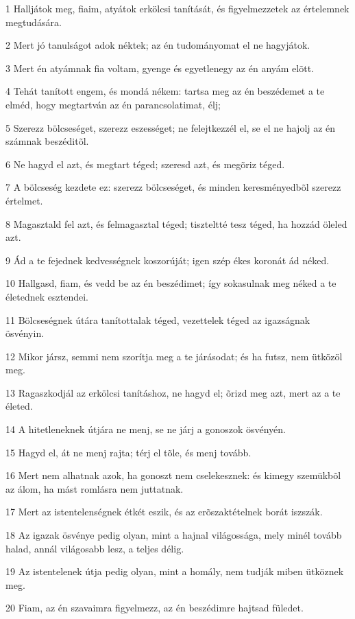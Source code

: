 \par 1 Halljátok meg, fiaim, atyátok erkölcsi tanítását, és figyelmezzetek az értelemnek megtudására.
\par 2 Mert jó tanulságot adok néktek; az én tudományomat el ne hagyjátok.
\par 3 Mert én atyámnak fia voltam, gyenge és egyetlenegy az én anyám elõtt.
\par 4 Tehát tanított engem, és mondá nékem: tartsa meg az én beszédemet a te elméd, hogy megtartván az én parancsolatimat, élj;
\par 5 Szerezz bölcseséget, szerezz eszességet; ne felejtkezzél el, se el ne hajolj az én számnak beszéditõl.
\par 6 Ne hagyd el azt, és megtart téged; szeresd azt, és megõriz téged.
\par 7 A bölcseség kezdete ez: szerezz bölcseséget, és minden keresményedbõl szerezz értelmet.
\par 8 Magasztald fel azt, és felmagasztal téged; tiszteltté tesz téged, ha hozzád öleled azt.
\par 9 Ád a te fejednek kedvességnek koszorúját; igen szép ékes koronát ád néked.
\par 10 Hallgasd, fiam, és vedd be az én beszédimet; így sokasulnak meg néked a te életednek esztendei.
\par 11 Bölcseségnek útára tanítottalak téged, vezettelek téged az igazságnak ösvényin.
\par 12 Mikor jársz, semmi nem szorítja meg a te járásodat; és ha futsz, nem ütközöl meg.
\par 13 Ragaszkodjál az erkölcsi tanításhoz, ne hagyd el; õrizd meg azt, mert az a te életed.
\par 14 A hitetleneknek útjára ne menj, se ne járj a gonoszok ösvényén.
\par 15 Hagyd el, át ne menj rajta; térj el tõle, és menj tovább.
\par 16 Mert nem alhatnak azok, ha gonoszt nem cselekesznek: és kimegy szemükbõl az álom, ha mást romlásra nem juttatnak.
\par 17 Mert az istentelenségnek étkét eszik, és az erõszaktételnek borát iszszák.
\par 18 Az igazak ösvénye pedig olyan, mint a hajnal világossága, mely minél tovább halad, annál világosabb lesz, a teljes délig.
\par 19 Az istentelenek útja pedig olyan, mint a homály, nem tudják miben ütköznek meg.
\par 20 Fiam, az én szavaimra figyelmezz, az én beszédimre hajtsad füledet.
